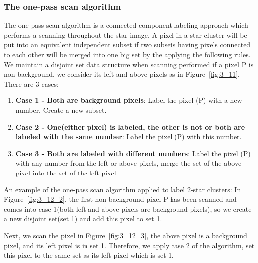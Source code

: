 \subsubsection{The one-pass scan algorithm}

The one-pass scan algorithm is a connected component labeling approach which performs a scanning throughout the star image. A pixel in a star cluster will be put into an equivalent independent subset if two subsets having pixels connected to each other will be merged into one big set by the applying the following rules. \\

\noindent We maintain a disjoint set data structure when scanning performed if a pixel P is non-background, we consider its left and above pixels as in Figure~\ref{fig:3_11}. There are 3 cases:

\begin{enumerate}
	\item \textbf{Case 1 - Both are background pixels}: Label the pixel (P) with a new number. Create a new subset.
	\item \textbf{Case 2 - One(either pixel) is labeled, the other is not or both are labeled with the same number}: Label the pixel (P) with this number.
	\item \textbf{Case 3 - Both are labeled with different numbers}: Label the pixel (P) with any number from the left or above pixels, merge the set of the above pixel into the set of the left pixel.
\end{enumerate}


\noindent An example of the one-pass scan algorithm applied to label 2-star clusters: In Figure~\ref{fig:3_12_2}, the first non-background pixel P has been scanned and comes into case 1(both left and above pixels are background pixels), so we create a new disjoint set(set 1) and add this pixel to set 1. 


\noindent Next, we scan the pixel in Figure~\ref{fig:3_12_3}, the above pixel is a background pixel, and its left pixel is in set 1. Therefore, we apply case 2 of the algorithm, set this pixel to the same set as its left pixel which is set 1.


